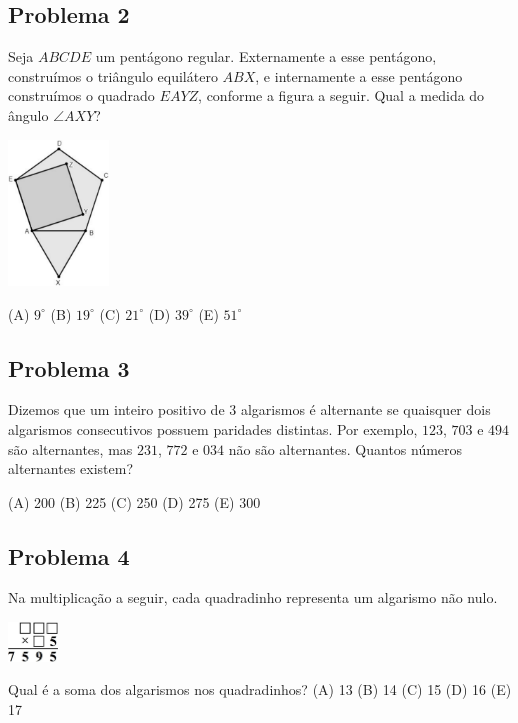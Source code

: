 \documentclass[12pt]{article}
\begin{document}
\subsection{Problema 2}
\begin{tcolorbox}[statementbox]
Seja $ABCDE$ um pentágono regular. Externamente a esse pentágono, construímos o triângulo equilátero $ABX$, e internamente a esse pentágono construímos o quadrado $EAYZ$, conforme a figura a seguir. Qual a medida do ângulo $\angle AXY$?

  \begin{center}
    \includegraphics[width=0.2\textwidth]{first.png}
  \end{center}

(A) $9^\circ$ (B) $19^\circ$ (C) $21^\circ$ (D) $39^\circ$ (E) $51^\circ$
\end{tcolorbox}
\clearpage

\subsection{Problema 3}
\begin{tcolorbox}[statementbox]
Dizemos que um inteiro positivo de $3$ algarismos é alternante se quaisquer dois algarismos consecutivos possuem paridades distintas. Por exemplo, $123$, $703$ e $494$ são alternantes, mas $231$, $772$ e $034$ não são alternantes. Quantos números alternantes existem?

(A) 200 (B) 225 (C) 250 (D) 275 (E) 300
\end{tcolorbox}
\clearpage

\subsection{Problema 4}
\begin{tcolorbox}[statementbox]
Na multiplicação a seguir, cada quadradinho representa um algarismo não nulo.

    \begin{center}
    \includegraphics[width=0.1\textwidth]{second.png}
  \end{center}


Qual é a soma dos algarismos nos quadradinhos?
(A) 13 (B) 14 (C) 15 (D) 16 (E) 17
\end{tcolorbox}
\clearpage
\end{document}
